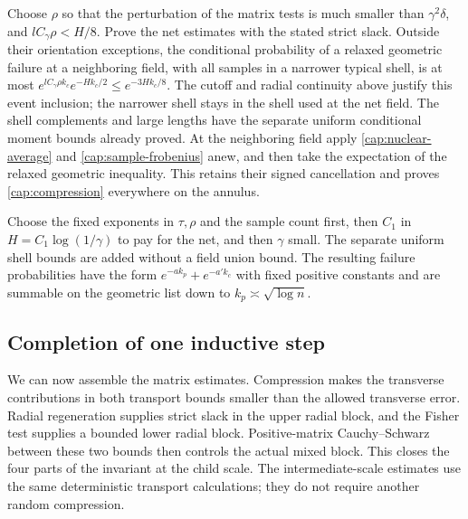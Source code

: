 Choose \(\rho\) so that the perturbation of the matrix tests is much
smaller than \(\gamma^2\delta\), and
\(lC_\gamma\rho<H/8\). Prove the net estimates with the stated strict
slack. Outside their orientation exceptions, the conditional probability of
a relaxed geometric failure at a neighboring field, with all samples in a
narrower typical shell, is at most
\(e^{lC_\gamma\rho k_c}e^{-Hk_c/2}\le e^{-3Hk_c/8}\).
The cutoff and radial continuity above justify this event inclusion; the
narrower shell stays in the shell used at the net field. The shell
complements and large lengths have the separate uniform conditional moment
bounds already proved. At the neighboring field apply
\eqref{cap:nuclear-average} and \eqref{cap:sample-frobenius} anew, and then
take the expectation of the relaxed geometric inequality. This retains
their signed cancellation and proves \eqref{cap:compression} everywhere
on the annulus.

Choose the fixed exponents in \(\tau,\rho\) and the sample count first,
then \(C_1\) in \(H=C_1\log(1/\gamma)\) to pay for the net, and then
\(\gamma\) small. The separate uniform shell bounds are added without a
field union bound. The resulting failure probabilities have the form
\(e^{-a k_p}+e^{-a'k_c}\) with fixed positive constants and are summable
on the geometric list down to \(k_p\asymp\sqrt{\log n}\).

\subsection{Completion of one inductive step}
We can now assemble the matrix estimates. Compression makes the
transverse contributions in both transport bounds smaller than the
allowed transverse error. Radial regeneration supplies strict slack in the
upper radial block, and the Fisher test supplies a bounded lower radial
block. Positive-matrix Cauchy--Schwarz between these two bounds then controls
the actual mixed block. This closes the four parts of the invariant at the
child scale. The intermediate-scale estimates use the same deterministic
transport calculations; they do not require another random compression.

